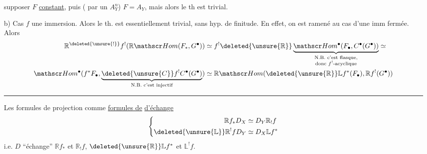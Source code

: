 supposer $F$ \uline{constant}, puis ( par un $A_Y^n$) $F=A_Y$, mais alors le th est trivial.

b) Cas $f$ une immersion. Alors le th. est essentiellement trivial, sans hyp. de finitude. En effet, on est ramené au cas d'une imm fermée. Alors
\[
\begin{aligned}
\mathbb R^{\deleted{\unsure{!}}}f^!(\mathbb R\mathscr Hom(F_{*},G^{\bullet}))&\simeq f^!\deleted{\unsure{\mathbb R}}\underbrace{\mathscr Hom^{\bullet}(F_{\bullet},C^{\bullet}(G^{\bullet}))}_{\substack{\text{N.B. c'est flasque,}\\\text{donc }f^!\text{-acyclique}}}\simeq\\
\mathscr Hom^{\bullet}(f^*F_{\bullet},\underbrace{\deleted{\unsure{C}}f^!C^{\bullet}(G^{\bullet})}_{\text{N.B. c'est injectif}})&\simeq\mathbb R\mathscr Hom(\deleted{\unsure{\mathbb R}}\mathbb L f^*(F_{\bullet}),\mathbb Rf^!(G^{\bullet}))
\end{aligned}
\]

\noindent\rule{.35\linewidth}{.3pt}

Les formules de projection  comme \uline{formules de}  \uline{d'échange}
\[
\left\{\begin{aligned}
\mathbb R f_*D_X&\simeq D_Y\mathbb R_!f\\
\deleted{\unsure{\mathbb L}}\mathbb R^!fD_Y&\simeq D_X\mathbb L f^*
\end{aligned}\right.
\]
i.e. $D$ ``échange'' $\mathbb Rf_*$ et $\mathbb R_!f$, $\deleted{\unsure{\mathbb R}}\mathbb Lf^*$ et $\mathbb L^!f$.

